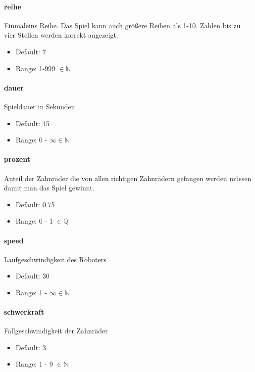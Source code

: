 \documentclass[]{article}
\begin{document}
\begin{multicols}{2}

	\paragraph{reihe}  Einmaleins Reihe. Das Spiel kann auch größere Reihen als 1-10. Zahlen bis zu vier Stellen werden korrekt angezeigt.
	\begin{itemize}
		\item Default:  7
		\item Range:  1-999 $\in \mathbb{N} $
	\end{itemize}

	\paragraph{dauer}  Spieldauer in Sekunden
	\begin{itemize}
		\item Default:  45
		\item Range: 0 - $\infty \in \mathbb{N}$
	\end{itemize}
	\paragraph{prozent} Anteil der Zahnräder die von allen richtigen Zahnrädern gefangen werden müssen damit man das Spiel gewinnt.
	\begin{itemize}
		\item Default:  0.75
		\item Range: 0 - 1 $\in \mathbb{Q}$
	\end{itemize}
	\paragraph{speed}  Laufgeschwindigkeit des Roboters
	\begin{itemize}
		\item Default:  30
		\item Range: 1 - $\infty \in \mathbb{N}$
	\end{itemize}
	\paragraph{schwerkraft}  Fallgeschwindigkeit der Zahnräder
	\begin{itemize}
		\item Default:  3
		\item Range:  1 - 9 $\in \mathbb{N}$
	\end{itemize}

\end{multicols}
\end{document}
